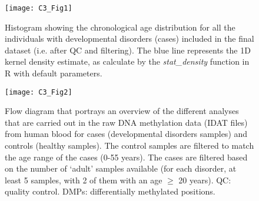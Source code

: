 \begin{figure}[htbp!] 
	\centering
	\vspace*{6mm}    
	\texttt{[image: C3\_Fig1]}
	\vspace*{2mm}
	\caption[Chronological age distribution in the individuals with developmental disorders]{Histogram showing the chronological age distribution for all the individuals with developmental disorders (cases) included in the final dataset (i.e. after QC and filtering). The blue line represents the 1D kernel density estimate, as calculate by the \textit{stat\_density} function in R with default parameters.}
	\label{fig:c3_fig1}
\end{figure}

\begin{figure}[htbp!] 
	\centering    
	\texttt{[image: C3\_Fig2]}
	\caption[Overview of the analyses performed in Chapter~\ref{c:3}]{Flow diagram that portrays an overview of the different analyses that are carried out in the raw DNA methylation data (IDAT files) from human blood for cases (developmental disorders samples) and controls (healthy samples). The control samples are filtered to match the age range of the cases (0-55 years). The cases are filtered based on the number of `adult’ samples available (for each disorder, at least 5 samples, with 2 of them with an age $\geq$ 20 years). QC: quality control. DMPs: differentially methylated positions.}
	\label{fig:c3_fig2}
\end{figure}

